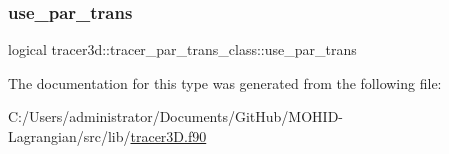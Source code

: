 \subsubsection{\texorpdfstring{use\+\_\+par\+\_\+trans}{use\_par\_trans}}
{\footnotesize\ttfamily logical tracer3d\+::tracer\+\_\+par\+\_\+trans\+\_\+class\+::use\+\_\+par\+\_\+trans\hspace{0.3cm}{\ttfamily [private]}}



The documentation for this type was generated from the following file\+:\begin{DoxyCompactItemize}
\item 
C\+:/\+Users/administrator/\+Documents/\+Git\+Hub/\+M\+O\+H\+I\+D-\/\+Lagrangian/src/lib/\mbox{\hyperlink{tracer3_d_8f90}{tracer3\+D.\+f90}}\end{DoxyCompactItemize}
